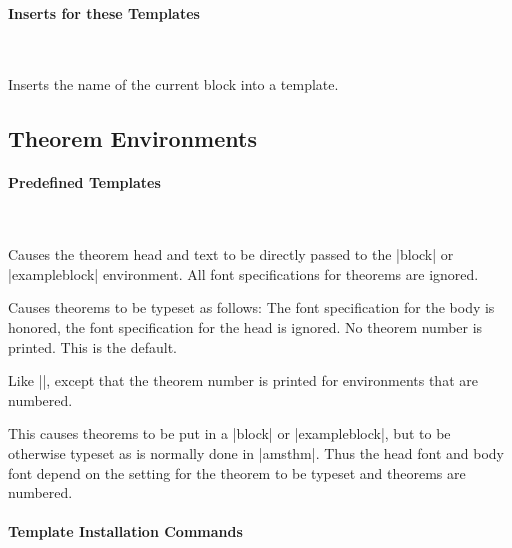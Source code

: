 \paragraph{Inserts for these Templates}\

\begin{command}{\insertblockname}
  Inserts the name of the current block into a template.
\end{command}



\subsection{Theorem Environments}

\label{section-theorems-templates}

\paragraph{Predefined Templates}\

\begin{command}{\beamertemplatetheoremssimple}
  Causes the theorem head and text to be directly passed to the
  |block| or |exampleblock| environment. All font specifications for
  theorems are ignored. 
\end{command}

\begin{command}{\beamertemplatetheoremsunnumbered}
  Causes theorems to be typeset as follows: The font specification for
  the body is honored, the font specification for the head is
  ignored. No theorem number is printed. This is the default.
\end{command}

\begin{command}{\beamertemplatetheoremsnumbered}
  Like |\beamertemplatetheoremsunnumbered|, except that the theorem
  number is printed for environments that are numbered.
\end{command}

\begin{command}{\beamertemplatetheoremsamslike}
  This causes theorems to be put in a |block| or |exampleblock|, but
  to be otherwise typeset as is normally done in |amsthm|. Thus the
  head font and body font depend on the setting for the theorem to be
  typeset and theorems are numbered. 
\end{command}



\paragraph{Template Installation Commands}\

